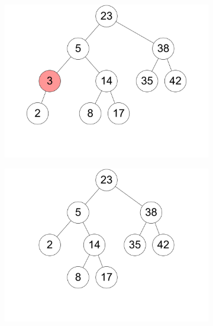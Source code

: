 \documentclass[11pt,a4paper]{article}
\begin{document}
\begin{loesung}
\begin{enumerate}
\begin{figure}[h!]
\begin{subfigure}[b]{0.23\textwidth}
                \includegraphics[width=\textwidth]{img/3a_13}
                \caption*{}
            \end{subfigure}
            \begin{subfigure}[b]{0.23\textwidth}
                \centering
                \includegraphics[width=\textwidth]{img/3a_14}
                \caption*{}
            \end{subfigure}
            \begin{subfigure}[b]{0.23\textwidth}
                \centering

\end{subfigure}
\end{figure}
\end{enumerate}
\end{loesung}
\end{document}
